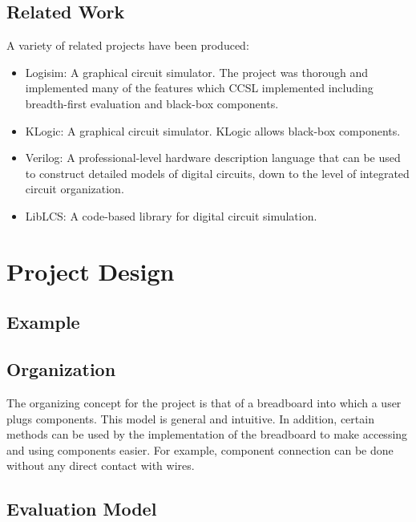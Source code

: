 \documentclass{article}
\begin{document}
\subsection{Related Work}

A variety of related projects have been produced:

\begin{itemize}

\item Logisim: A graphical circuit simulator. The project was thorough and implemented many of the features which CCSL implemented including breadth-first evaluation and black-box components.\cite{Logisim}

\item KLogic: A graphical circuit simulator. KLogic allows black-box components.\cite{KLogic}

\item Verilog: A professional-level hardware description language that can be used to construct detailed models of digital circuits, down to the level of integrated circuit organization.\cite{Verilog}

\item LibLCS: A code-based library for digital circuit simulation.\cite{libLCS}

\end{itemize}

\section{Project Design}

\subsection{Example}

\subsection{Organization}

The organizing concept for the project is that of a breadboard into which a user plugs components. This model is general and intuitive. In addition, certain methods can be used by the implementation of the breadboard to make accessing and using components easier. For example, component connection can be done without any direct contact with wires.

\subsection{Evaluation Model}
\end{document}
